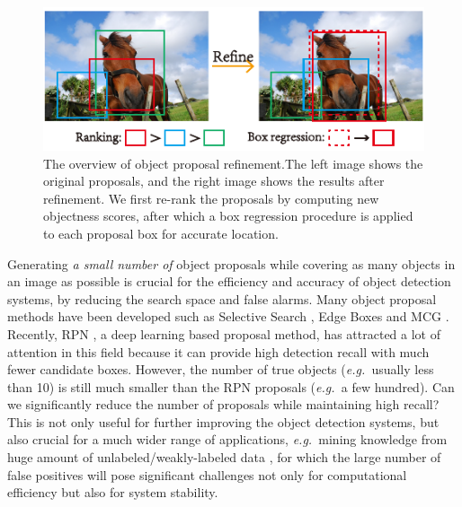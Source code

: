 \documentclass[letterpaper]{article} %
\def\eg{\emph{e.g.~}}
\newcommand{\cmm}[1]{{\textcolor{blue}{#1}}}
\begin{document}
\begin{figure}[t]
	\centering
    \includegraphics[width=\linewidth]{box_refinement}
    \caption{The overview of object proposal refinement.The left image shows the
    	original proposals, and the right image shows the results after refinement.
        We first re-rank the proposals by computing new objectness scores, after
        which a box regression procedure is applied to each proposal box for
        accurate location.}
    \label{fig:refinement_overview}
\end{figure}


Generating \emph{a small number of} object proposals while covering as
many objects in an image as possible is crucial for the efficiency
and accuracy of object detection systems,
by reducing the search space and false alarms.
%
Many object proposal methods have been developed such as Selective Search
\cite{uijlings2013selective}, Edge Boxes \cite{zitnick2014edge} and
MCG \cite{arbelaez2014multiscale}.
%
Recently, RPN \cite{ren2015faster}, a deep learning based proposal
method, has attracted a lot of attention in this field because it can provide
high detection recall with much fewer candidate boxes.
However, the number of true objects (\eg usually less than 10)
is still much smaller than the RPN proposals (\eg a few hundred).
%
Can we significantly reduce the number of proposals while maintaining
high recall?
This is not only useful for further improving the object detection systems,
but also crucial for a much wider range of applications,
\eg mining knowledge from huge amount of unlabeled/weakly-labeled 
data \cite{wei2016hcp,wu2015deep},
for which the large number of false positives will pose significant challenges
not only for computational efficiency but also for system stability.

\end{document}
